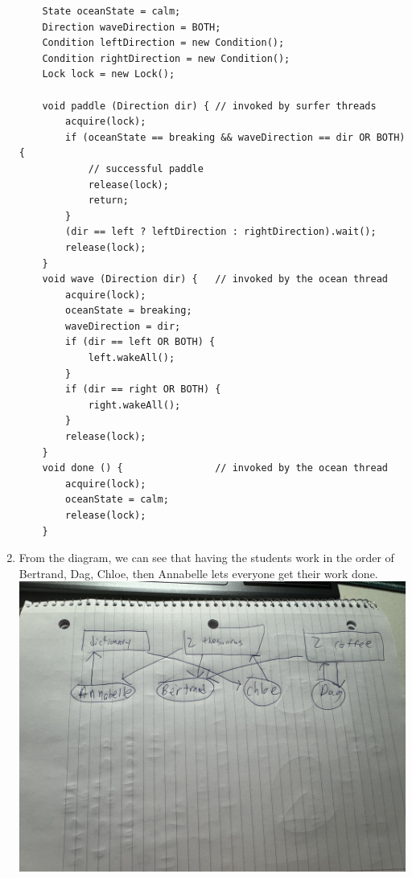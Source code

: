 \documentclass{article}
\begin{document}
\begin{enumerate}
\begin{lstlisting}
    State oceanState = calm;
    Direction waveDirection = BOTH;
    Condition leftDirection = new Condition();
    Condition rightDirection = new Condition();
    Lock lock = new Lock();

    void paddle (Direction dir) { // invoked by surfer threads
        acquire(lock);
        if (oceanState == breaking && waveDirection == dir OR BOTH) {
            // successful paddle
            release(lock);
            return;
        }
        (dir == left ? leftDirection : rightDirection).wait();
        release(lock);
    }
    void wave (Direction dir) {   // invoked by the ocean thread
        acquire(lock);   
        oceanState = breaking;
        waveDirection = dir;
        if (dir == left OR BOTH) {
            left.wakeAll();
        } 
        if (dir == right OR BOTH) {
            right.wakeAll();
        } 
        release(lock);
    }
    void done () {                // invoked by the ocean thread
        acquire(lock);
        oceanState = calm;
        release(lock);
    }
\end{lstlisting}
\item 
From the diagram, we can see that having the students work in the order of 
Bertrand, Dag, Chloe, then Annabelle 
lets everyone get their work done.
\includegraphics[width = 15cm]{diagram.jpg}

\end{enumerate}
\end{document}
